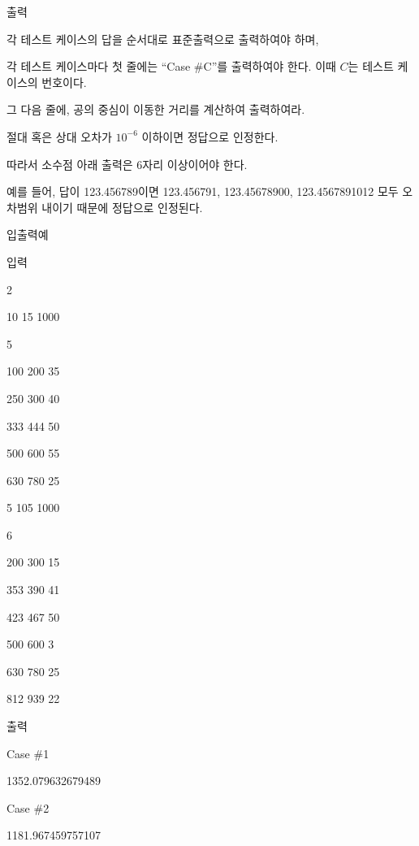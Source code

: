 \documentclass [12pt] {oblivoir}
\begin{document}
출력

각 테스트 케이스의 답을 순서대로 표준출력으로 출력하여야 하며,

각 테스트 케이스마다 첫 줄에는 “Case \#C”를 출력하여야 한다. 이때 $C$는 테스트 케이스의 번호이다.

그 다음 줄에, 공의 중심이 이동한 거리를 계산하여 출력하여라.

절대 혹은 상대 오차가 $10^{-6}$ 이하이면 정답으로 인정한다.

따라서 소수점 아래 출력은 6자리 이상이어야 한다.

예를 들어, 답이 123.456789이면 123.456791, 123.45678900, 123.4567891012 모두 오차범위 내이기 때문에 정답으로 인정된다.

입출력예

입력

2

10 15 1000

5

100 200 35

250 300 40

333 444 50

500 600 55

630 780 25

5 105 1000

6

200 300 15

353 390 41

423 467 50

500 600 3

630 780 25

812 939 22

출력

Case \#1

1352.079632679489

Case \#2

1181.967459757107
\end{document}
